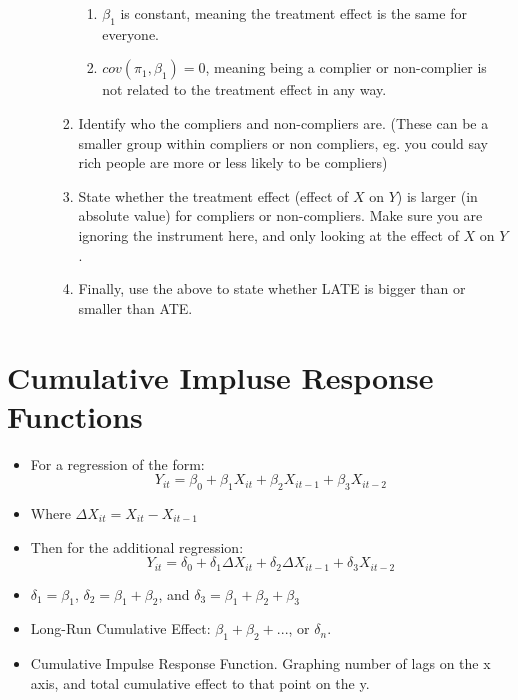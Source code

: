 \documentclass{article}
\begin{document}
\begin{itemize}
\begin{itemize}
\begin{enumerate}
\begin{enumerate}
                \item $\beta_1$ is constant, meaning the treatment effect is the same for everyone.
                \item $cov(\pi_1, \beta_1) = 0$, meaning being a complier or non-complier is not related to the treatment effect in any way.
            \end{enumerate}
            \item Identify who the compliers and non-compliers are. (These can be a smaller group within compliers or non compliers, eg. you could say rich people are more or less likely to be compliers)
            \item State whether the treatment effect (effect of $X$ on $Y$) is larger (in absolute value) for compliers or non-compliers. Make sure you are ignoring the instrument here, and only looking at the effect of $X$ on $Y$.
            \item Finally, use the above to state whether LATE is bigger than or smaller than ATE.
        \end{enumerate}
    \end{itemize}
\end{itemize}

\section{Cumulative Impluse Response Functions}
\begin{itemize}
    \item For a regression of the form:
    $$Y_{it} = \beta_0 + \beta_1 X_{it} + \beta_2 X_{it - 1} + \beta_3 X_{it - 2} $$
    \item Where $\Delta X_{it} = X_{it} - X_{it-1}$
    \item Then for the additional regression:
    $$Y_{it} = \delta_0 + \delta_1 \Delta X_{it} + \delta_2 \Delta X_{it - 1} + \delta_3 X_{it - 2} $$
    \item $\delta_1 = \beta_1$, $\delta_2 = \beta_1 + \beta_2$, and $\delta_3 = \beta_1 + \beta_2 + \beta_3$
    \item Long-Run Cumulative Effect: $\beta_1 + \beta_2 + ...$, or $\delta_n$.
    \item Cumulative Impulse Response Function. Graphing number of lags on the x axis, and total cumulative effect to that point on the y.
\end{itemize}
\end{document}
